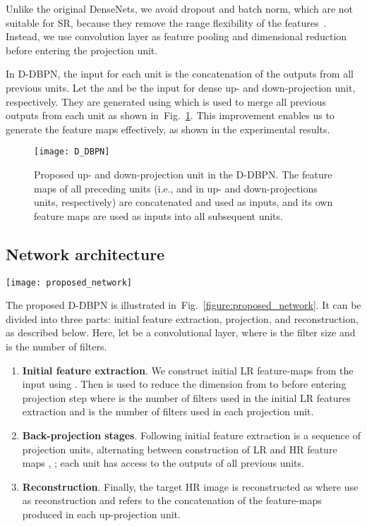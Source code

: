 \documentclass[10pt,twocolumn,letterpaper]{article}
\begin{document}
Unlike the original DenseNets, we avoid dropout and batch norm, which are not suitable for SR, because they remove the range flexibility of the features~\cite{Lim_2017_CVPR_Workshops}.
Instead, we use  convolution layer as feature pooling and dimensional reduction~\cite{szegedy2015going,Haris17} before entering the projection unit.


In D-DBPN, the input for each unit is the concatenation of the outputs from all previous units. Let the  and  be the input for dense up- and down-projection unit, respectively. They are generated using  which is used to merge all previous outputs from each unit as shown in~Fig.~\ref{figure:D_DBPN}. This improvement enables us to generate the feature maps effectively, as shown in the experimental results.

\begin{figure}[t!]
\centering
\texttt{[image: D\_DBPN]}
\caption{Proposed up- and down-projection unit in the D-DBPN. The feature maps of all preceding units (i.e.,  and  in up- and down-projections units, respectively) are concatenated and used as inputs, and its own feature maps are used as inputs into all subsequent units.}
\label{figure:D_DBPN}
\end{figure}

\subsection{Network architecture}
\begin{figure*}[t]
\centering
\texttt{[image: proposed\_network]}
\caption{An implementation of D-DBPN for super-resolution. Unlike the original DBPN, D-DBPN exploits densely connected projection unit to encourage feature reuse.}
\label{figure:proposed_network}
\end{figure*}

The proposed D-DBPN is illustrated in~Fig.~\ref{figure:proposed_network}. It can be divided into three
parts: initial feature extraction, projection, and reconstruction, as
described below. Here, let  be a convolutional layer,
where  is the filter size and  is the number of filters. 

\begin{enumerate}
\item \textbf{Initial feature extraction}. We construct initial LR
  feature-maps  from the input using . 
  Then  is used to reduce the dimension from  to  before
  entering projection step where  is the number of filters used in the initial LR features extraction and  is the number of filters used in each projection unit.
\item \textbf{Back-projection stages}. Following initial feature
  extraction is a sequence of projection units, alternating between
  construction of LR and HR feature maps ,
  ; each unit has access to the outputs of all previous
  units.

\item \textbf{Reconstruction}. Finally, the target HR image is
  reconstructed as  where  use  as
  reconstruction and  refers to the concatenation of the feature-maps
  produced in each up-projection unit.
\end{enumerate}
\end{document}
